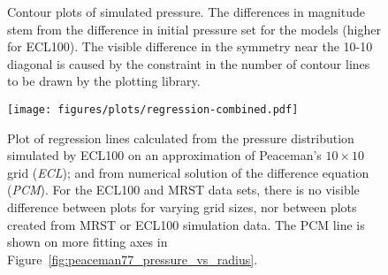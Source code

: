 \begin{figure}
    \begin{minipage}[b]{.5\linewidth}
        \centering\scalebox{.53}{}
        \label{fig:contour-ecl10}
    \end{minipage}%
    \begin{minipage}[b]{.5\linewidth}
        \centering\scalebox{.53}{}
        \label{fig:contour-mrst10}
    \end{minipage}
    \caption{Contour plots of simulated pressure. The differences in magnitude stem from the difference in initial pressure set for the models (higher for ECL100). The visible difference in the symmetry near the 10-10 diagonal is caused by the constraint in the number of contour lines to be drawn by the plotting library.}
    \label{fig:contours-ect10-mrst10}
\end{figure}


\begin{figure}[htbp]
    \centering
    \texttt{[image: figures/plots/regression-combined.pdf]}
    \caption{Plot of regression lines calculated from the pressure distribution simulated by ECL100 on an approximation of Peaceman's $10\times 10$ grid (\emph{ECL}); and from numerical solution of the difference equation (\emph{PCM}). For the ECL100 and MRST data sets, there is no visible difference between plots for varying grid sizes, nor between plots created from MRST or ECL100 simulation data. The PCM line is shown on more fitting axes in Figure~\ref{fig:peaceman77_pressure_vs_radius}.}
    \label{fig:regression-combined}
\end{figure}



